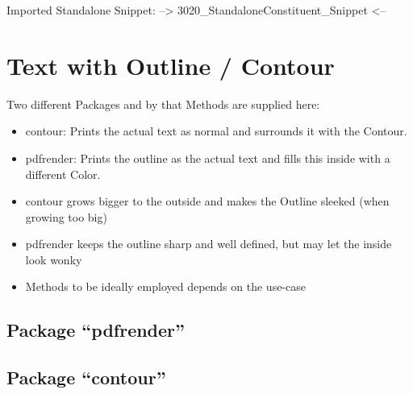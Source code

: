 \np
Imported Standalone Snippet: -->
{3020_StandaloneConstituent_Snippet}
<--


\section{Text with Outline / Contour}
Two different Packages and by that Methods are supplied here:
\begin{itemize}
    \item contour: Prints the actual text as normal and surrounds it with the Contour.
    \item pdfrender: Prints the outline as the actual text and fills this inside with a different Color.
\end{itemize}

\begin{itemize}[labpragA]
    \item contour grows bigger to the outside and makes the Outline sleeked (when growing too big)
    \item pdfrender keeps the outline sharp and well defined, but may let the inside look wonky
\end{itemize}

\begin{itemize}[labpragB]
    \item Methods to be ideally employed depends on the use-case
\end{itemize}

\subsection{Package \enquote{pdfrender}}
{%
    \Huge%
    \sffamily%
    \textcolor{violet}{%
    }\nl%
    \textcolor{violet}{%
    }%
}%

\subsection{Package \enquote{contour}}
{%
    \LARGE%
    \contourlength{\DenKrOutlineWidth}%
    \nl%
    {%
        \contourlength{0.2em}%
        \nl%
        \nl%
    }%
    \nl%
}%


